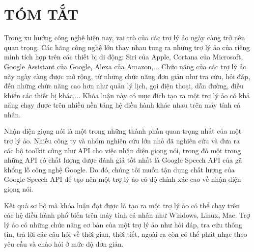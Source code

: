 \newpage
\chapter*{TÓM TẮT}

Trong xu hướng công nghệ hiện nay, vai trò của các trợ lý ảo ngày càng trở nên quan trọng. Các hãng công nghệ lớn thay nhau tung ra những trợ lý ảo của riêng mình tích hợp trên các thiết bị di động: Siri của Apple, Cortana của Microsoft, Google Assistant của Google, Alexa của Amazon,... Chức năng của các trợ lý ảo này ngày càng được mở rộng, từ những chức năng đơn giản như tra cứu, hỏi đáp, đến những chức năng cao hơn như quản lý lịch, gọi điện thoại, dẫn đường, điều khiển các thiết bị khác,... Khóa luận này có mục đích tạo ra một trợ lý ảo có khả năng chạy được trên nhiều nền tảng hệ điều hành khác nhau trên máy tính cá nhân. 

Nhận diện giọng nói là một trong những thành phần quan trọng nhất của một trợ lý ảo. Nhiều công ty và nhóm nghiên cứu lớn nhỏ đã nghiên cứu và đưa ra các bộ toolkit cũng như API cho việc nhận diện giọng nói, trong đó một trong những API có chất lượng được đánh giá tốt nhất là Google Speech API của gã khổng lồ công nghệ Google. Do đó, chúng tôi muốn tận dụng chất lượng của Google Speech API để tạo nên một trợ lý ảo có độ chính xác cao về nhận diện giọng nói. 

Kết quả sơ bộ mà khóa luận đạt được là tạo ra một trợ lý ảo có thể chạy trên các hệ điều hành phổ biến trên máy tính cá nhân như Windows, Linux, Mac. Trợ lý ảo có những chức năng cơ bản của một trợ lý ảo như hỏi đáp, tra cứu thông tin, trả lời các câu hỏi về thời gian, thời tiết, ngoài ra còn có thể phát nhạc theo yêu cầu và chào hỏi ở mức độ đơn giản. 

